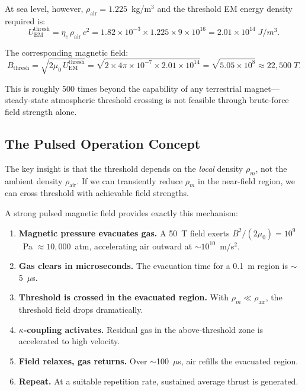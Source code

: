 \documentclass[amsmath,amssymb,aps,prd,superscriptaddress,nofootinbib]{revtex4-2}
\newcommand{\etac}{\eta_c}
\begin{document}
At sea level, however, $\rho_\text{air} = 1.225$~kg/m$^3$ and the
threshold EM energy density required is:
\begin{equation}
U_\text{EM}^\text{thresh} = \etac \, \rho_\text{air} \, c^2
= 1.82 \times 10^{-3} \times 1.225 \times 9 \times 10^{16}
= 2.01 \times 10^{14} \; \si{J/m^3}.
\end{equation}

The corresponding magnetic field:
\begin{equation}
B_\text{thresh} = \sqrt{2\mu_0 \, U_\text{EM}^\text{thresh}}
= \sqrt{2 \times 4\pi \times 10^{-7} \times 2.01 \times 10^{14}}
= \sqrt{5.05 \times 10^{8}}
\approx 22{,}500 \; \si{T}.
\end{equation}

This is roughly 500 times beyond the capability of any terrestrial
magnet---steady-state atmospheric threshold crossing is not feasible
through brute-force field strength alone.

\subsection{The Pulsed Operation Concept}

The key insight is that the threshold depends on the \emph{local}
density $\rho_m$, not the ambient density $\rho_\text{air}$. If we
can transiently reduce $\rho_m$ in the near-field region, we can cross
threshold with achievable field strengths.

A strong pulsed magnetic field provides exactly this mechanism:
\begin{enumerate}
\item \textbf{Magnetic pressure evacuates gas.} A 50~T field exerts
  $B^2/(2\mu_0) = 10^9$~Pa $\approx 10{,}000$~atm, accelerating air
  outward at $\sim 10^{10}$~m/s$^2$.
\item \textbf{Gas clears in microseconds.} The evacuation time for a
  0.1~m region is $\sim$5~$\mu$s.
\item \textbf{Threshold is crossed in the evacuated region.} With
  $\rho_m \ll \rho_\text{air}$, the threshold field drops dramatically.
\item \textbf{$\kappa$-coupling activates.} Residual gas in the
  above-threshold zone is accelerated to high velocity.
\item \textbf{Field relaxes, gas returns.} Over $\sim$100~$\mu$s, air
  refills the evacuated region.
\item \textbf{Repeat.} At a suitable repetition rate, sustained
  average thrust is generated.
\end{enumerate}
\end{document}
